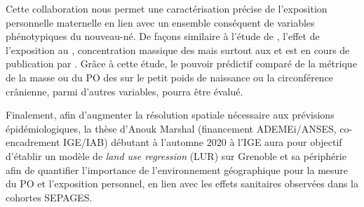 Cette collaboration nous permet une caractérisation précise de
l'exposition personnelle maternelle en lien avec un ensemble conséquent de variables
phénotypiques du nouveau-né.
De façons similaire à l'étude de \cite{ouidirEstimation2015}, l'effet de l'exposition au
, concentration massique des \PMdc{} mais surtout aux \POAAv{} et \PODTTv{} est en
cours de publication par \cite{borlazaPersonalinprep.}.
Grâce à cette étude, le pouvoir prédictif comparé de la métrique de la masse ou du PO des \PMdc{}
sur le petit poids de naissance ou la circonférence crânienne, parmi d'autres variables,
pourra être évalué.

Finalement, afin d'augmenter la résolution spatiale nécessaire aux prévisions
épidémiologiques, la thèse d'Anouk Marshal (financement ADEMEi/ANSES, co-encadrement IGE/IAB) débutant à l'automne 2020 à
l'IGE aura pour objectif d'établir un modèle de \textit{land use regression} (LUR) sur
Grenoble et sa périphérie afin de quantifier l'importance de l'environnement géographique
pour la mesure du PO et l'exposition personnel, en lien avec les effets sanitaires
observées dans la cohortes SEPAGES.

%


